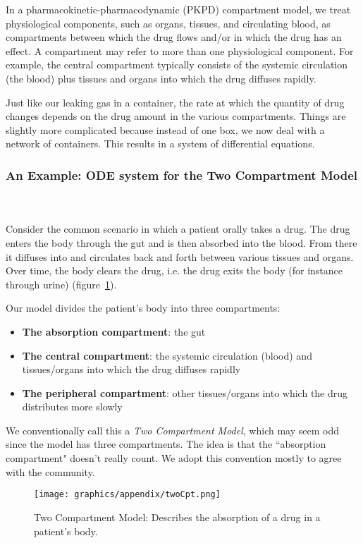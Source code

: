 \documentclass[11pt]{amsart}
\begin{document}
In a pharmacokinetic-pharmacodynamic (PKPD) compartment model, we treat physiological components, such as organs, tissues, and circulating blood, as compartments between which the drug flows and/or in which the drug has an effect. A compartment may refer to more than one physiological component. For example, the central compartment typically consists of the systemic circulation (the blood) plus tissues and organs into which the drug diffuses rapidly.

Just like our leaking gas in a container, the rate at which the quantity of drug changes depends on the drug amount in the various compartments. Things are slightly more complicated because instead of one box, we now deal with a network of containers. This results in a system of differential equations.

\subsubsection{An Example: ODE system for the Two Compartment Model} \ \\ \ \\
Consider the common scenario in which a patient orally takes a drug. The drug enters the body through the gut and is then absorbed into the blood. From there it diffuses into and circulates back and forth between various tissues and organs. Over time, the body clears the drug, i.e. the drug exits the body (for instance through urine)  (figure~\ref{TwoCptNice}).

Our model divides the patient's body into three compartments:
\begin{itemize}
  \item \textbf{The absorption compartment}: the gut
  \item \textbf{The central compartment}: the systemic circulation (blood) and tissues/organs into which the drug diffuses rapidly
  \item \textbf{The peripheral compartment}: other tissues/organs into which the drug distributes more slowly
\end{itemize}

We conventionally call this a \textit{Two Compartment Model}, which may seem odd since the model has three compartments. The idea is that the ``absorption compartment" doesn't really count. We adopt this convention mostly to agree with the community.

\begin{figure}[!htb]
\begin{center}
\texttt{[image: graphics/appendix/twoCpt.png]}
\caption{{Two Compartment Model: Describes the absorption of a drug in a patient's body.}}
\label{TwoCptNice}
\end{center}
\end{figure}
\end{document}

